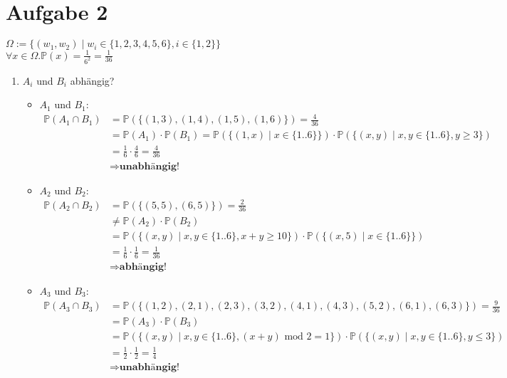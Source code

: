 \documentclass[10pt,a4paper,parskip=half]{scrartcl}
\newcommand{\PP}{\mathbb{P}}
\begin{document}
\section*{Aufgabe 2}
$\Omega := \{(w_1,w_2) \mid w_i \in \{1,2,3,4,5,6\}, i \in \{1,2\}\}$ \\
 $\forall x \in \Omega.\PP(x) = \frac{1}{6^2} = \frac{1}{36}$
\begin{enumerate}
	\item $A_i$ und $B_i$ abhängig?
		\begin{itemize}
			\item $A_1$ und $B_1$: \\
				\begin{align*}
					\PP(A_1 \cap B_1) &= \PP(\{(1,3),(1,4),(1,5),(1,6)\})  = \frac{4}{36} \\
					&= \PP(A_1) \cdot \PP(B_1) =  \PP(\{(1,x) \mid x \in \{1..6\}\}) \cdot \PP(\{(x,y) \mid x,y \in \{1..6\}, y \ge 3\}) \\
					&= \frac{1}{6} \cdot \frac{4}{6} = \frac{4}{36} \\
					&\Rightarrow \textbf{unabhängig!}
				\end{align*}
			\item $A_2$ und $B_2$: \\
				\begin{align*}
					\PP(A_2 \cap B_2) &= \PP(\{(5,5),(6,5)\})  = \frac{2}{36} \\
					&\neq \PP(A_2) \cdot \PP(B_2) \\
					&= \PP(\{(x,y) \mid x,y \in \{1..6\}, x+y \ge 10\}) \cdot \PP(\{(x,5) \mid x \in \{1..6\}\}) \\
					&= \frac{1}{6} \cdot \frac{1}{6} = \frac{1}{36} \\
					&\Rightarrow \textbf{abhängig!}
				\end{align*}
			\item $A_3$ und $B_3$: \\
				\begin{align*}
					\PP(A_3 \cap B_3) &= \PP(\{(1, 2), (2, 1), (2, 3), (3, 2), (4, 1), (4, 3), (5, 2),(6, 1),(6, 3)\})  = \frac{9}{36} \\
					&= \PP(A_3) \cdot \PP(B_3) \\
					& = \PP(\{(x,y) \mid x,y \in \{1..6\}, (x + y) \text{ mod } 2 = 1\}) \cdot \PP(\{ (x,y) \mid x,y \in \{1..6\}, y \le 3\}) \\
					&= \frac{1}{2} \cdot \frac{1}{2} = \frac{1}{4} \\
					&\Rightarrow \textbf{unabhängig!}
				\end{align*}

\end{itemize}
\end{enumerate}
\end{document}
